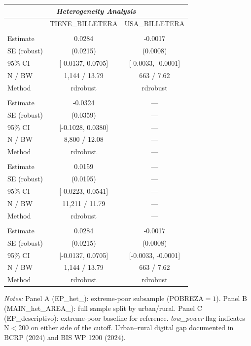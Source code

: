 \begin{threeparttable}
\begin{tabular}{l cc}
\toprule
\multicolumn{3}{c}{\textit{Heterogeneity Analysis}} \\
\midrule
  & TIENE\_BILLETERA & USA\_BILLETERA \\
\midrule
\addlinespace
\multicolumn{3}{l}{\textit{EP\_het\_baseline}} \\
  Estimate & 0.0284 & -0.0017 \\
  SE (robust) & (0.0215) & (0.0008) \\
  95\% CI & [-0.0137, 0.0705] & [-0.0033, -0.0001] \\
  N / BW & 1{,}144 / 13.79 & 663 / 7.62 \\
  Method & rdrobust & rdrobust \\
\addlinespace
\multicolumn{3}{l}{\textit{MAIN\_het\_AREA\_urbano}} \\
  Estimate & -0.0324 & --- \\
  SE (robust) & (0.0359) & --- \\
  95\% CI & [-0.1028, 0.0380] & --- \\
  N / BW & 8{,}800 / 12.08 & --- \\
  Method & rdrobust & --- \\
\addlinespace
\multicolumn{3}{l}{\textit{MAIN\_het\_AREA\_rural}} \\
  Estimate & 0.0159 & --- \\
  SE (robust) & (0.0195) & --- \\
  95\% CI & [-0.0223, 0.0541] & --- \\
  N / BW & 11{,}211 / 11.79 & --- \\
  Method & rdrobust & --- \\
\addlinespace
\multicolumn{3}{l}{\textit{EP\_descriptivo}} \\
  Estimate & 0.0284 & -0.0017 \\
  SE (robust) & (0.0215) & (0.0008) \\
  95\% CI & [-0.0137, 0.0705] & [-0.0033, -0.0001] \\
  N / BW & 1{,}144 / 13.79 & 663 / 7.62 \\
  Method & rdrobust & rdrobust \\
\bottomrule
\end{tabular}
\begin{tablenotes}
\small
\item \textit{Notes:} Panel A (EP\_het\_): extreme-poor subsample (POBREZA$=1$). Panel B (MAIN\_het\_AREA\_): full sample split by urban/rural. Panel C (EP\_descriptivo): extreme-poor baseline for reference. \textit{low\_power} flag indicates N$<$200 on either side of the cutoff. Urban--rural digital gap documented in BCRP (2024) and BIS WP 1200 (2024).
\end{tablenotes}
\end{threeparttable}